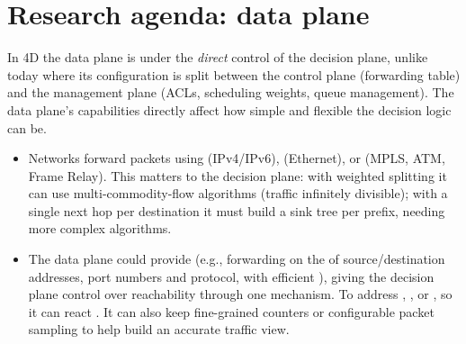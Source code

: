 \section{Research agenda: data plane}
In 4D the data plane is under the \emph{direct} control of the decision plane, unlike today where its configuration is split between the control plane (forwarding table) and the management plane (ACLs, scheduling weights, queue management). The data plane's capabilities directly affect how simple and flexible the decision logic can be.
\begin{itemize}
\item {} Networks forward packets using  (IPv4/IPv6),  (Ethernet), or  (MPLS, ATM, Frame Relay).  This matters to the decision plane: with weighted splitting it can use multi-commodity-flow algorithms (traffic infinitely divisible); with a single next hop per destination it must build a sink tree per prefix, needing more complex algorithms.
\item {} The data plane could provide  (e.g., forwarding on the  of source/destination addresses, port numbers and protocol, with efficient ), giving the decision plane control over reachability through one mechanism. To address , , or , so it can react . It can also keep fine-grained counters or configurable packet sampling to help build an accurate traffic view.
\end{itemize}

